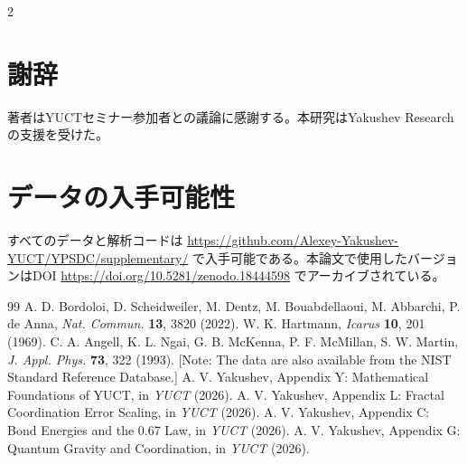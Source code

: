 \documentclass[11pt,a4paper]{article}
\begin{document}
\begin{multicols}{2}
		\section*{謝辞}
		
		著者はYUCTセミナー参加者との議論に感謝する。本研究はYakushev Researchの支援を受けた。
		
		\section*{データの入手可能性}
		すべてのデータと解析コードは \url{https://github.com/Alexey-Yakushev-YUCT/YPSDC/supplementary/} で入手可能である。本論文で使用したバージョンはDOI \url{https://doi.org/10.5281/zenodo.18444598} でアーカイブされている。
		
		\begin{thebibliography}{99}
			 A. D. Bordoloi, D. Scheidweiler, M. Dentz, M. Bouabdellaoui, M. Abbarchi, P. de Anna, \emph{Nat. Commun.} \textbf{13}, 3820 (2022).
			 W. K. Hartmann, \emph{Icarus} \textbf{10}, 201 (1969).
			 C. A. Angell, K. L. Ngai, G. B. McKenna, P. F. McMillan, S. W. Martin, \emph{J. Appl. Phys.} \textbf{73}, 322 (1993). [Note: The data are also available from the NIST Standard Reference Database.]
			 A. V. Yakushev, Appendix Y: Mathematical Foundations of YUCT, in \emph{YUCT} (2026).
			 A. V. Yakushev, Appendix L: Fractal Coordination Error Scaling, in \emph{YUCT} (2026).
			 A. V. Yakushev, Appendix C: Bond Energies and the 0.67 Law, in \emph{YUCT} (2026).
			 A. V. Yakushev, Appendix G: Quantum Gravity and Coordination, in \emph{YUCT} (2026).
		\end{thebibliography}
		
	\end{multicols}
\end{document}
